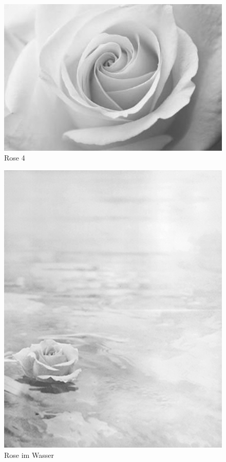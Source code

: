 \documentclass[ngerman,a4paper,11pt]{scrreprt}
\begin{document}
\begin{figure}[H]
\centering
\includegraphics[width=\textwidth,height=.8\textheight,keepaspectratio]{Bilder/Bilder/750_0010_13971_Rose_im_Wald.png}
\caption{\label{img_Rose_4}Rose 4}
\end{figure}

\begin{figure}[H]
\centering
\includegraphics[width=\textwidth,height=.8\textheight,keepaspectratio]{Bilder/Bilder/750_0010_12458_Seerose_test.png}
\caption{\label{img_Rose_im_Wasser}Rose im Wasser}
\end{figure}
\end{document}
